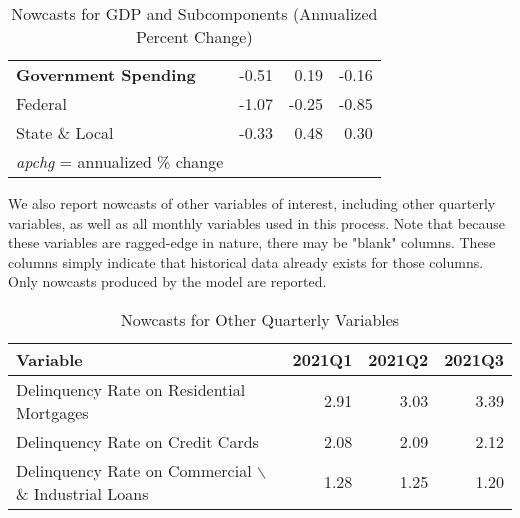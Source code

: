 \documentclass[11pt, letterpaper]{article}\usepackage[]{graphicx}\usepackage[]{color}
\begin{document}
\begin{table}[H]
\begin{tabular}{lrrr}
  \hspace{0mm} \textbf{Government Spending} & -0.51 & 0.19 & -0.16 \\ 
  \hspace{8mm}  Federal & -1.07 & -0.25 & -0.85 \\ 
  \hspace{8mm}  State \& Local & -0.33 & 0.48 & 0.30 \\ 
   \hline 
 \textit{apchg} = annualized \% change 
\end{tabular}
\endgroup
\caption{Nowcasts for GDP and Subcomponents (Annualized Percent Change)} 
\end{table}


We also report nowcasts of other variables of interest, including other quarterly variables, as well as all monthly variables used in this process. Note that because these variables are ragged-edge in nature, there may be "blank" columns. These columns simply indicate that historical data already exists for those columns. Only nowcasts produced by the model are reported.
\begin{table}[H]
\centering
\begingroup\fontsize{11pt}{13pt}\selectfont
\begin{tabular}{lrrr}
  \hline
Variable & 2021Q1 & 2021Q2 & 2021Q3 \\ 
  \hline
Delinquency Rate on Residential Mortgages & 2.91 & 3.03 & 3.39 \\ 
  Delinquency Rate on Credit Cards & 2.08 & 2.09 & 2.12 \\ 
  Delinquency Rate on Commercial $\backslash$\& Industrial Loans & 1.28 & 1.25 & 1.20 \\ 
   \hline
\end{tabular}
\endgroup
\caption{Nowcasts for Other Quarterly Variables} 
\end{table}
\end{document}

